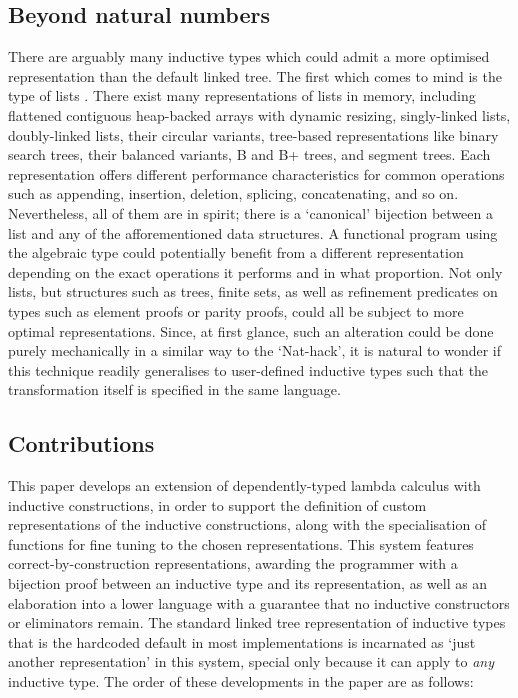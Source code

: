 \subsection{Beyond natural numbers}

There are arguably many inductive types which could admit a more optimised
representation than the default linked tree. The first which comes to mind is
the type of lists . There exist many
representations of lists in memory, including flattened contiguous heap-backed
arrays with dynamic resizing, singly-linked lists, doubly-linked lists, their
circular variants, tree-based representations like binary search trees, their
balanced variants, B and B+ trees, and segment trees. Each representation
offers different performance characteristics for common operations such as
appending, insertion, deletion, splicing, concatenating, and so on.
Nevertheless, all of them are  in spirit; there is a `canonical'
bijection between a list and any of the afforementioned data structures. A
functional program using the algebraic  type could potentially
benefit from a different representation depending on the exact operations it
performs and in what proportion. Not only lists, but structures such as trees,
finite sets, as well as refinement predicates on types such as element proofs
or parity proofs, could all be subject to more optimal representations. Since,
at first glance, such an alteration could be done purely mechanically in a
similar way to the `Nat-hack', it is natural to wonder if this technique
readily generalises to user-defined inductive types such that the
transformation itself is specified in the same language.

\subsection{Contributions}

This paper develops an extension of dependently-typed lambda calculus with
inductive constructions, in order to support the definition of custom
representations of the inductive constructions, along with the specialisation
of functions for fine tuning to the chosen representations. This system
features correct-by-construction representations, awarding the programmer with
a bijection proof between an inductive type and its representation, as well as
an elaboration into a lower language with a guarantee that no inductive
constructors or eliminators remain. The standard linked tree representation of
inductive types that is the hardcoded default in most implementations is
incarnated as `just another representation' in this system, special only
because it can apply to \emph{any} inductive type. The order of these
developments in the paper are as follows:

